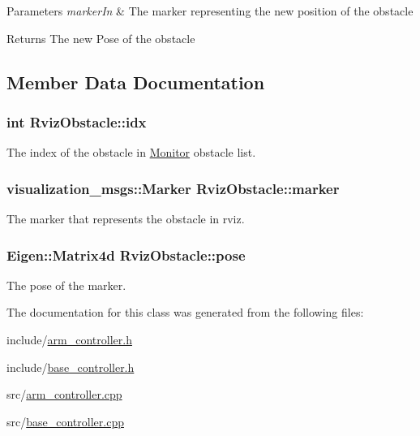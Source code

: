 \begin{DoxyParams}{Parameters}
{\em marker\+In} & The marker representing the new position of the obstacle \\
\hline
\end{DoxyParams}
\begin{DoxyReturn}{Returns}
The new Pose of the obstacle 
\end{DoxyReturn}


\subsection{Member Data Documentation}
\subsubsection[{\texorpdfstring{idx}{idx}}]{\setlength{\rightskip}{0pt plus 5cm}int Rviz\+Obstacle\+::idx}\hypertarget{class_rviz_obstacle_aac6f99fde043e8d9c0e9d0bab32fd375}{}\label{class_rviz_obstacle_aac6f99fde043e8d9c0e9d0bab32fd375}


The index of the obstacle in \hyperlink{class_monitor}{Monitor} obstacle list. 

\subsubsection[{\texorpdfstring{marker}{marker}}]{\setlength{\rightskip}{0pt plus 5cm}visualization\+\_\+msgs\+::\+Marker Rviz\+Obstacle\+::marker}\hypertarget{class_rviz_obstacle_a9edb18553236c56fb49e9d181e0ed052}{}\label{class_rviz_obstacle_a9edb18553236c56fb49e9d181e0ed052}


The marker that represents the obstacle in rviz. 

\subsubsection[{\texorpdfstring{pose}{pose}}]{\setlength{\rightskip}{0pt plus 5cm}Eigen\+::\+Matrix4d Rviz\+Obstacle\+::pose}\hypertarget{class_rviz_obstacle_aa48c4d1a26938cb932aac1439373b60b}{}\label{class_rviz_obstacle_aa48c4d1a26938cb932aac1439373b60b}


The pose of the marker. 



The documentation for this class was generated from the following files\+:\begin{DoxyCompactItemize}
\item 
include/\hyperlink{arm__controller_8h}{arm\+\_\+controller.\+h}\item 
include/\hyperlink{base__controller_8h}{base\+\_\+controller.\+h}\item 
src/\hyperlink{arm__controller_8cpp}{arm\+\_\+controller.\+cpp}\item 
src/\hyperlink{base__controller_8cpp}{base\+\_\+controller.\+cpp}\end{DoxyCompactItemize}
